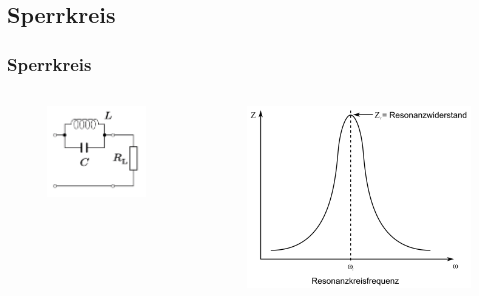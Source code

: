 \subsection*{Sperrkreis}
\begin{frame}
  \frametitle{Sperrkreis}
  \begin{columns}
    \begin{center}
      \begin{figure}
        \includegraphics[width=\textwidth,height=.5\textheight,keepaspectratio]{e07/Sperrkreis.png}
      \end{figure}
    \end{center}
    \begin{center}
      \begin{figure}
        \includegraphics[width=\textwidth,height=.5\textheight,keepaspectratio]{e07/ParallelschwSig.png}

\end{figure}
\end{center}
\end{columns}
\end{frame}
